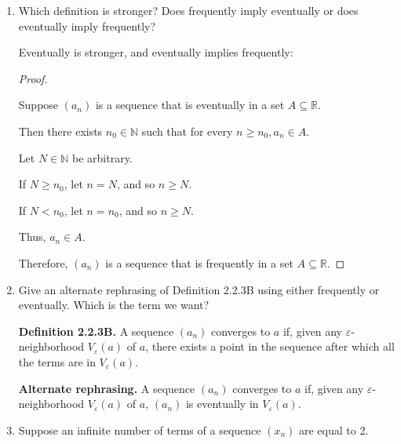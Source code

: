 \documentclass[12pt]{article}
\newcommand{\RR}{\mathbb{R}} %
\newcommand{\NN}{\mathbb{N}}
\newcommand{\eps}{\varepsilon}
\begin{document}
\begin{enumerate}
\begin{enumerate}
\begin{enumerate}
\begin{enumerate}
\begin{proof}
By contradiction.

Suppose $a_n$ is eventually in $A$.

Then there exists $N \in \NN$ such that for every $n \ge N, a_n \in A$.

If $N$ is even, then let $m = N + 1$, and so $m$ is odd.

If $N$ is odd, then let $m = N + 2$, and so $m$ is odd.

Since $m \ge N$, then it must be that $m \in A$.

However, $a_m = (-1)^m = -1 \notin A$, which is a contradiction.
\end{proof}
\end{enumerate}

\item Which definition is stronger? Does frequently imply eventually or does eventually imply frequently?

Eventually is stronger, and eventually implies frequently:

\begin{proof}
$ $

Suppose $(a_n)$ is a sequence that is eventually in a set $A \subseteq \RR$.

Then there exists $n_0 \in \NN$ such that for every $n \ge n_0, a_n \in A$.

Let $N \in \NN$ be arbitrary.

If $N \ge n_0$, let $n = N$, and so $n \ge N$.

If $N < n_0$, let $n = n_0$, and so $n \ge N$.

Thus, $a_n \in A$.

Therefore, $(a_n)$ is a sequence that is frequently in a set $A \subseteq \RR$.
\end{proof}

\item Give an alternate rephrasing of Definition 2.2.3B using either frequently or eventually. Which is the term we want?

\textbf{Definition 2.2.3B.} A sequence $(a_n)$ converges to $a$ if, given any $\eps$-neighborhood $V_{\eps} (a)$ of $a$, there exists a point in the sequence after which all the terms are in $V_{\eps} (a)$.

\textbf{Alternate rephrasing.} A sequence $(a_n)$ converges to $a$ if, given any $\eps$-neighborhood $V_{\eps} (a)$ of $a$, $(a_n)$ is eventually in $V_{\eps} (a)$.

\item Suppose an infinite number of terms of a sequence $(x_n)$ are equal to 2.


\end{enumerate}
\end{enumerate}
\end{enumerate}
\end{document}

